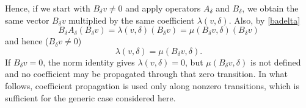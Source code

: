 \documentclass[twoside,a4paper,12pt]{article}
\theoremstyle{definition}
\begin{document}
Hence, if we start with $B_\delta v\neq0$ and apply operators $A_\delta$ and
$B_\delta$, we obtain the same vector $B_\delta v$ multiplied by the same
coefficient $\lambda(v,\delta)$. Also, by \eqref{badelta}
\begin{equation*}%
	B_\delta A_\delta(B_\delta v)=\lambda(v,\delta)(B_\delta v)
	=\mu(B_\delta v,\delta)(B_\delta v)
\end{equation*}
and hence ($B_\delta v\neq0$)
\begin{equation*}%
	\lambda(v,\delta)=\mu(B_\delta v,\delta).
\end{equation*}
If $B_\delta v=0$, the norm identity gives $\lambda(v,\delta)=0$, but
$\mu(B_\delta v,\delta)$ is not defined and no coefficient may be propagated
through that zero transition. In what follows, coefficient propagation is used
only along nonzero transitions, which is sufficient for the generic case
considered here.
\end{document}
